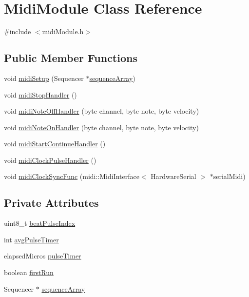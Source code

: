 \hypertarget{class_midi_module}{}\section{Midi\+Module Class Reference}
\label{class_midi_module}


{\ttfamily \#include $<$midi\+Module.\+h$>$}

\subsection*{Public Member Functions}
\begin{DoxyCompactItemize}
\item 
void \hyperlink{class_midi_module_a01d9e776bbe4586a3d69a4e3daa54198}{midi\+Setup} (Sequencer $\ast$\hyperlink{class_midi_module_ab407f65f92a693100a5c638f1cde14c0}{sequence\+Array})
\item 
void \hyperlink{class_midi_module_a0dc8fc76183fd5b102b1e35a12373088}{midi\+Stop\+Handler} ()
\item 
void \hyperlink{class_midi_module_a6aba8f34fbe85384c19d03aed5307acf}{midi\+Note\+Off\+Handler} (byte channel, byte note, byte velocity)
\item 
void \hyperlink{class_midi_module_a9d949d05ada00beebe12e01589309699}{midi\+Note\+On\+Handler} (byte channel, byte note, byte velocity)
\item 
void \hyperlink{class_midi_module_aa3e24f459a5a9d732ca60c9bb8ac943c}{midi\+Start\+Continue\+Handler} ()
\item 
void \hyperlink{class_midi_module_a1bf6988219b4e272cc9b3c662dcda562}{midi\+Clock\+Pulse\+Handler} ()
\item 
void \hyperlink{class_midi_module_ad056b64f96805ece5c60084663e53340}{midi\+Clock\+Sync\+Func} (midi\+::\+Midi\+Interface$<$ Hardware\+Serial $>$ $\ast$serial\+Midi)
\end{DoxyCompactItemize}
\subsection*{Private Attributes}
\begin{DoxyCompactItemize}
\item 
uint8\+\_\+t \hyperlink{class_midi_module_a8e3b952f2432be01a9eadc72983deca2}{beat\+Pulse\+Index}
\item 
int \hyperlink{class_midi_module_af1cd2b4bdb8585148d1cb4fa8b283999}{avg\+Pulse\+Timer}
\item 
elapsed\+Micros \hyperlink{class_midi_module_a94669a447b35f1bfbbe8a335335dc789}{pulse\+Timer}
\item 
boolean \hyperlink{class_midi_module_a819a46463bb610739ecd87a152fb4ea3}{first\+Run}
\item 
Sequencer $\ast$ \hyperlink{class_midi_module_ab407f65f92a693100a5c638f1cde14c0}{sequence\+Array}
\end{DoxyCompactItemize}



